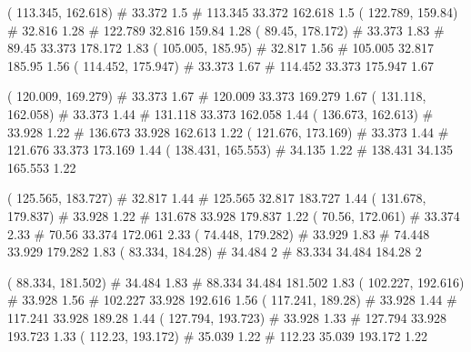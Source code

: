 \documentclass[a4paper,openbib,10pt]{article}
\newenvironment{treegraph}{\begin{graph}}{\end{graph}}
\begin{document}
\begin{treegraph}
  ( 113.345, 162.618) #     33.372    1.5
   #    113.345    33.372    162.618    1.5
  ( 122.789, 159.84) #     32.816    1.28
   #    122.789    32.816    159.84    1.28
  ( 89.45, 178.172) #     33.373    1.83
   #    89.45    33.373    178.172    1.83
  ( 105.005, 185.95) #     32.817    1.56
   #    105.005    32.817    185.95    1.56
  ( 114.452, 175.947) #     33.373    1.67
   #    114.452    33.373    175.947    1.67

  ( 120.009, 169.279) #     33.373    1.67
   #    120.009    33.373    169.279    1.67
  ( 131.118, 162.058) #     33.373    1.44
   #    131.118    33.373    162.058    1.44
  ( 136.673, 162.613) #     33.928    1.22
   #    136.673    33.928    162.613    1.22
  ( 121.676, 173.169) #     33.373    1.44
   #    121.676    33.373    173.169    1.44
  ( 138.431, 165.553) #     34.135    1.22
   #    138.431    34.135    165.553    1.22

  ( 125.565, 183.727) #     32.817    1.44
   #    125.565    32.817    183.727    1.44
  ( 131.678, 179.837) #     33.928    1.22
   #    131.678    33.928    179.837    1.22
  ( 70.56, 172.061) #     33.374    2.33
   #    70.56    33.374    172.061    2.33
  ( 74.448, 179.282) #     33.929    1.83
   #    74.448    33.929    179.282    1.83
  ( 83.334, 184.28) #     34.484    2
   #    83.334    34.484    184.28    2

  ( 88.334, 181.502) #     34.484    1.83
   #    88.334    34.484    181.502    1.83
  ( 102.227, 192.616) #     33.928    1.56
   #    102.227    33.928    192.616    1.56
  ( 117.241, 189.28) #     33.928    1.44
   #    117.241    33.928    189.28    1.44
  ( 127.794, 193.723) #     33.928    1.33
   #    127.794    33.928    193.723    1.33
  ( 112.23, 193.172) #     35.039    1.22
   #    112.23    35.039    193.172    1.22


\end{treegraph}
\end{document}
